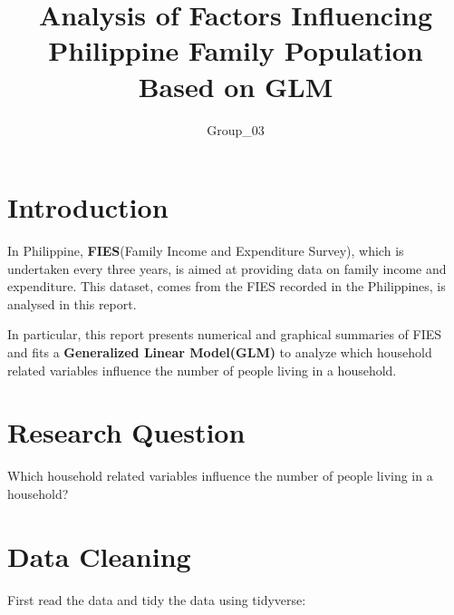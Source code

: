 \documentclass[
]{article}
\title{Analysis of Factors Influencing Philippine Family Population
Based on GLM}
\author{Group\_03}
\date{}
\begin{document}
\maketitle
\ifdefined\Shaded\renewenvironment{Shaded}{\begin{tcolorbox}[enhanced, borderline west={3pt}{0pt}{shadecolor}, interior hidden, boxrule=0pt, frame hidden, sharp corners, breakable]}{\end{tcolorbox}}\fi

\hypertarget{introduction}{%
\section{Introduction}\label{introduction}}

In Philippine, \textbf{FIES}(Family Income and Expenditure Survey),
which is undertaken every three years, is aimed at providing data on
family income and expenditure. This dataset, comes from the FIES
recorded in the Philippines, is analysed in this report.

In particular, this report presents numerical and graphical summaries of
FIES and fits a \textbf{Generalized Linear Model(GLM)} to analyze which
household related variables influence the number of people living in a
household.

\hypertarget{research-question}{%
\section{Research Question}\label{research-question}}

Which household related variables influence the number of people living
in a household?

\hypertarget{data-cleaning}{%
\section{Data Cleaning}\label{data-cleaning}}

First read the data and tidy the data using tidyverse:
\end{document}
